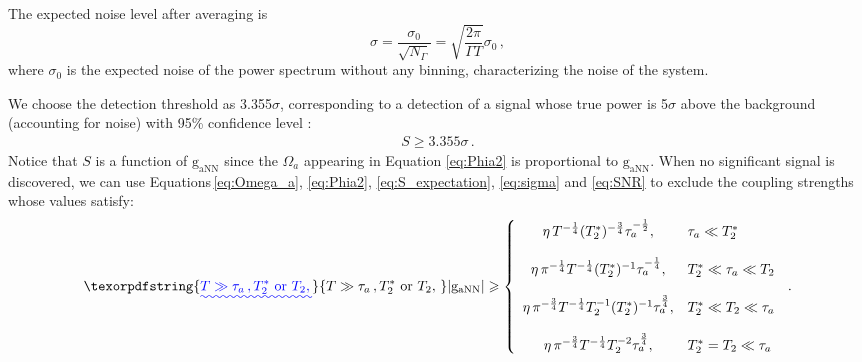 \documentclass{WileyMSP-template}
\newcommand{\AW}[1]{\textcolor{cyan}{Arne: #1}}
\providecommand{\DIFaddtex}[1]{{\protect\color{blue}\uwave{#1}}} %
\providecommand{\DIFaddbegin}{} %
\providecommand{\DIFaddend}{} %
\providecommand{\DIFadd}[1]{\texorpdfstring{\DIFaddtex{#1}}{#1}} %
\begin{document}
	The expected noise level after averaging is
	\begin{equation}
		\sigma = \dfrac{\sigma_{0}}{\sqrt{N_{\Gamma} }} = \sqrt{\dfrac{2\pi }{\Gamma T}} \sigma_{0}
		\,,\label{eq:sigma}
	\end{equation} 
	where $\sigma_{0}$ is the expected noise of the power spectrum without any binning, characterizing the noise of the system. 

	We choose the detection threshold as 3.355$\sigma$, corresponding to a detection of a signal whose true power is 5$\sigma$ above the background  (accounting for noise) with 95\% confidence level \cite{Gramolin2021NaturePhysics, Brubaker_PhysRevD.96.123008}:
	\begin{align}
		S \geqslant 3.355 \sigma
		\,. \label{eq:SNR}
	\end{align}
	Notice that $S$ is a function of $\mathrm{g_{aNN}}$ since the $\Omega_a$ appearing in Equation \eqref{eq:Phia2} is proportional to $\mathrm{g_{aNN}}$. 
	When no significant signal is discovered, we can use Equations\,\eqref{eq:Omega_a}, \eqref{eq:Phia2}, \eqref{eq:S_expectation}, \eqref{eq:sigma} and \eqref{eq:SNR} to exclude the coupling strengths whose values satisfy:
	\begin{equation}
		\DIFaddbegin \DIFadd{T\gg\tau_a\,,T_2^*\, \,\text{or}\,\,T_2,\, }\DIFaddend |\mathrm{g_{aNN}}| \geqslant 
		\left\{
		\begin{array}{cl}
			\eta\, T^{-\frac{1}{4}} (T_2^*)^{-\frac{3}{4}} \tau_a^{-\frac{1}{2}} ,
			& \tau_a\ll T_2^* \\
			& \\
			\eta\, \pi^{-\frac{1}{4}} T^{-\frac{1}{4}} (T_2^*)^{-1} \tau_a^{-\frac{1}{4}} ,
			&  T_2^*\ll\tau_a \ll T_2\\
			& \\
			\eta\, \pi^{-\frac{3}{4}} T^{-\frac{1}{4}} T_2^{-1} (T_2^*)^{-1} \tau_a^{\frac{3}{4}}  ,
			&  T_2^*\ll T_2\ll\tau_a \\
			& \\
			\eta\, \pi^{-\frac{3}{4}} T^{-\frac{1}{4}} T_2^{-2} \tau_a^{\frac{3}{4}}   ,
			&  T_2^*= T_2\ll\tau_a
		\end{array} \right.
		\,. \label{eq:exclusion_threshold}
	\end{equation}
\end{document}
